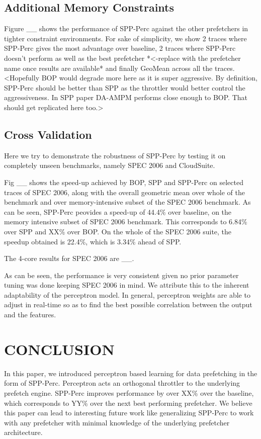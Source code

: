 \documentclass{sig-alternate}
\begin{document}
\subsection{Additional Memory Constraints}
Figure \_\_ shows the performance of SPP-Perc against the other prefetchers in tighter constraint environments. 
For sake of simplicity, we show 2 traces where SPP-Perc gives the most advantage over baseline, 2 traces where SPP-Perc doesn't perform as well as the best prefetcher *<-replace with the prefetcher name once results are available* and finally GeoMean across all the traces. 
<Hopefully BOP would degrade more here as it is super aggressive. 
By definition, SPP-Perc should be better than SPP as the throttler would better control the aggressiveness. 
In SPP paper DA-AMPM performs close enough to BOP. That should get replicated here too.>

\subsection{Cross Validation}
Here we try to demonstrate the robustness of SPP-Perc by testing it on completely unseen benchmarks, namely SPEC 2006 and CloudSuite.

Fig \_\_ shows the speed-up achieved by BOP, SPP and SPP-Perc on selected traces of SPEC 2006, along with the overall geometric mean over whole of the benchmark and over memory-intensive subset of the SPEC 2006 benchmark.
As can be seen, SPP-Perc peovides a speed-up of 44.4\% over baseline, on the memory intensive subset of SPEC 2006 benchmark.
This corresponds to 6.84\% over SPP and XX\% over BOP.
On the whole of the SPEC 2006 suite, the speedup obtained is 22.4\%, which is 3.34\% ahead of SPP.

The 4-core results for SPEC 2006 are \_\_.

As can be seen, the performance is very consistent given no prior parameter tuning was done keeping SPEC 2006 in mind. 
We attribute this to the inherent adaptability of the perceptron model.
In general, perceptron weights are able to adjust in real-time so as to find the best possible correlation between the output and the features.

\section{CONCLUSION}
In this paper, we introduced perceptron based learning for data prefetching in the form of SPP-Perc. 
Perceptron acts an orthogonal throttler to the underlying prefetch engine. 
SPP-Perc improves performance by over XX\% over the baseline, which corresponds to YY\% over the next best performing prefetcher. 
We believe this paper can lead to interesting future work like generalizing SPP-Perc to work with any prefetcher with minimal knowledge of the underlying prefetcher architecture.




\end{document}
